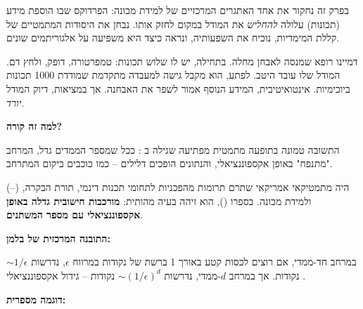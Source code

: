 

\noindent\textbf{}

\vspace{0.5cm}

בפרק זה נחקור את אחד האתגרים המרכזיים של למידת מכונה: הפרדוקס שבו הוספת מידע (תכונות) עלולה \textit{להחליש} את המודל במקום לחזק אותו. נבחן את היסודות המתמטיים של קללת המימדיות, נוכיח את השפעותיה, ונראה כיצד היא משפיעה על אלגוריתמים שונים.


דמיינו רופא שמנסה לאבחן מחלה. בתחילה, יש לו שלוש תכונות: טמפרטורה, דופק, ולחץ דם. המודל שלו עובד היטב. לפתע, הוא מקבל גישה למעבדה מתקדמת שמודדת \num{1000} תכונות ביוכימיות. אינטואיטיבית, המידע הנוסף אמור לשפר את האבחנה. אך במציאות, דיוק המודל \textit{יורד}.

\textbf{למה זה קורה?}

התשובה טמונה בתופעה מתמטית מפתיעה שגילה  ב\en{-} \cite{bellman1957}: ככל שמספר הממדים גדל, המרחב "מתנפח" באופן אקספוננציאלי, והנתונים הופכים דלילים  – כמו כוכבים ביקום המתרחב.


 (–) היה מתמטיקאי אמריקאי שתרם תרומות מהפכניות לתחומי תכנות דינמי, תורת הבקרה, ולמידת מכונה. בספרו  (), הוא זיהה בעיה מהותית: \textbf{מורכבות חישובית גדלה באופן אקספוננציאלי עם מספר המשתנים}.

\textbf{התובנה המרכזית של בלמן:}

במרחב חד-ממדי, אם רוצים לכסות קטע באורך \num{1} ברשת של נקודות במרווח $\epsilon$, נדרשות $\sim \num{1}/\epsilon$ נקודות. אך במרחב $d$-ממדי, נדרשות $\sim (\num{1}/\epsilon)^d$ נקודות – גידול אקספוננציאלי \cite{bellman1957}.

\textbf{דוגמה מספרית:}

